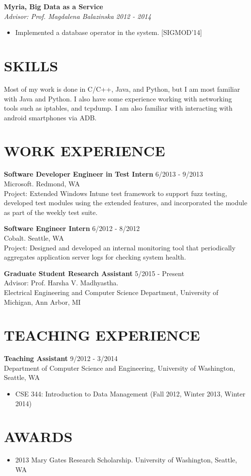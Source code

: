 \documentclass[zhemargin]{res}
\begin{document}
\begin{resume}
	\textbf{Myria, Big Data as a Service}\\
    \textit{Advisor: Prof. Magdalena Balazinska \hfill 2012 - 2014}
	\begin{itemize}
    \item Implemented a database operator in the system. [SIGMOD'14]
	\end{itemize}

\section{\small SKILLS}
	Most of my work is done in C/C++, Java, and Python, but I am most familiar 
  with Java and Python. I also have some experience working with networking 
  tools such as iptables, and tcpdump. I am also familiar with interacting 
  with android smartphones via ADB.

\section{\small WORK EXPERIENCE}
    \textbf{Software Developer Engineer in Test Intern} \hfill 6/2013 - 9/2013 \\
    Microsoft. Redmond, WA\\
    Project: Extended Windows Intune test framework to support fuzz testing, developed test modules using the extended features, and incorporated the module as part of the weekly test suite.

    \textbf{Software Engineer Intern} \hfill 6/2012 - 8/2012 \\
    Cobalt. Seattle, WA\\
    Project: Designed and developed an internal monitoring tool that periodically aggregates application server logs for checking system health.

    \textbf{Graduate Student Research Assistant} \hfill 5/2015 - Present \\
    Advisor: Prof. Harsha V. Madhyastha.\\
    Electrical Engineering and Computer Science Department, University of Michigan, Ann Arbor, MI

\section{\small TEACHING EXPERIENCE}
	\textbf{Teaching Assistant} \hfill 9/2012 - 3/2014 \\
	Department of Computer Science and Engineering, University of Washington, Seattle, WA
	\begin{itemize}
      \item CSE 344: Introduction to Data Management (Fall 2012, Winter 2013, Winter 2014)
	\end{itemize}

\section{\small AWARDS}
	\begin{itemize}[leftmargin=*, topsep=-10pt] %
    \item 2013 Mary Gates Research Scholarship. University of Washington, Seattle, WA
	\end{itemize}

\end{resume}
\end{document}
